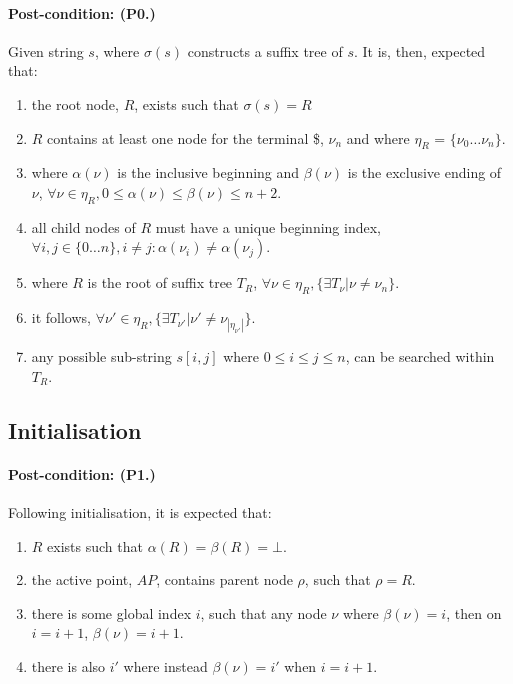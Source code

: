 \documentclass{article}
\begin{document}
	\paragraph{Post-condition: (P0.)} 
	Given string $s$, where $\sigma(s)$ constructs a suffix tree of $s$.  It is, then, expected that:
	
	\begin{enumerate}[label=(P0.\arabic*), ref=(P0.\arabic*)]
		\item the root node, $R$, exists such that $\sigma(s) = R$
		\item $R$ contains at least one node for the terminal \$, $\nu_{n}$ and where $\eta_R$ = $\{\nu_0 \dots \nu_n \}$.
		\item where $\alpha(\nu)$ is the inclusive beginning and $\beta(\nu)$ is the exclusive ending of $\nu$, $\forall \nu \in \eta_R, 0 \le \alpha(\nu) \le \beta(\nu) \le n + 2$.
		\item all child nodes of $R$ must have a unique beginning index, $\forall i, j \in \{0\dots n\}, i \ne j: \alpha(\nu_i) \ne \alpha(\nu_j)$.
		\item where $R$ is the root of suffix tree $T_R$, $\forall \nu \in \eta_R, \{\exists T_{\nu} | \nu \ne \nu_n\}$.
		\item it follows, $\forall \nu\prime \in \eta_R, \{\exists T_{\nu\prime} | \nu\prime \ne \nu_{|\eta_{\nu\prime}|}\}$.
		\item any possible sub-string $s[i, j]$ where $0 \le i \le j \le n$, can be searched within $T_R$.
	\end{enumerate}
	
	\subsection{Initialisation}
	
	\paragraph{Post-condition: (P1.)}
	Following initialisation, it is expected that:
	\begin{enumerate}[label=(P1.\arabic*), ref=(P1.\arabic*)]
		\item $R$ exists such that $\alpha(R) = \beta(R) = \bot$.
		\item the active point, $AP$, contains parent node $\rho$, such that $\rho = R$.
		\item there is some global index $i$, such that any node $\nu$ where $\beta(\nu) = i$, then on $i = i + 1$, $\beta(\nu) = i + 1$.  
		\item there is also $i\prime$ where instead $\beta(\nu) = i\prime$ when $i = i + 1$.
	\end{enumerate}
	
\end{document}
